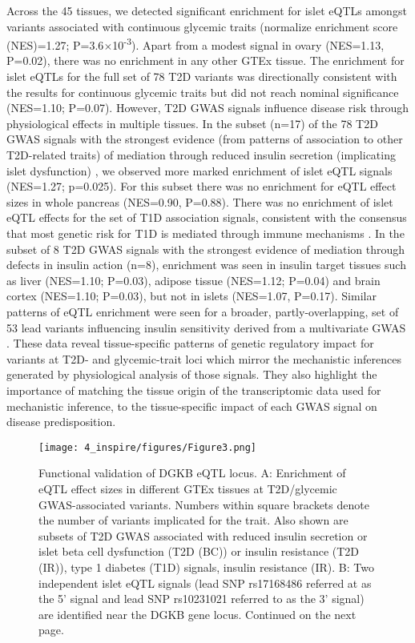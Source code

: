 Across the 45 tissues, we detected significant enrichment for islet eQTLs amongst variants associated with continuous glycemic traits (normalize enrichment score (NES)=1.27; P=3.6$\times$10\textsuperscript{-3}). Apart from a modest signal in ovary (NES=1.13, P=0.02), there was no enrichment in any other GTEx tissue. The enrichment for islet eQTLs for the full set of 78 T2D variants was directionally consistent with the results for continuous glycemic traits but did not reach nominal significance (NES=1.10; P=0.07). However, T2D GWAS signals influence disease risk through physiological effects in multiple tissues. In the subset (n=17) of the 78 T2D GWAS signals with the strongest evidence (from patterns of association to other T2D-related traits) of mediation through reduced insulin secretion (implicating islet dysfunction) \cite{mahajanRefiningAccuracyValidated2018, dimasImpactTypeDiabetes2014, woodGenomeWideAssociationStudy2017}, we observed more marked enrichment of islet eQTL signals (NES=1.27; p=0.025). For this subset there was no enrichment for eQTL effect sizes in whole pancreas (NES=0.90, P=0.88). There was no enrichment of islet eQTL effects for the set of T1D association signals, consistent with the consensus that most genetic risk for T1D is mediated through immune mechanisms \cite{onengut-gumuscuFineMappingType2015}.
In the subset of 8 T2D GWAS signals with the strongest evidence of mediation through defects in insulin action (n=8), enrichment was seen in insulin target tissues such as liver (NES=1.10; P=0.03), adipose tissue (NES=1.12; P=0.04) and brain cortex (NES=1.10; P=0.03), but not in islets (NES=1.07, P=0.17). Similar patterns of eQTL enrichment were seen for a broader, partly-overlapping, set of 53 lead variants influencing insulin sensitivity derived from a multivariate GWAS \cite{lottaIntegrativeGenomicAnalysis2017}. 
These data reveal tissue-specific patterns of genetic regulatory impact for variants at T2D- and glycemic-trait loci which mirror the mechanistic inferences generated by physiological analysis of those signals. They also highlight the importance of matching the tissue origin of the transcriptomic data used for mechanistic inference, to the tissue-specific impact of each GWAS signal on disease predisposition.

\begin{figure}
    \centering
    \texttt{[image: 4\_inspire/figures/Figure3.png]}
    \caption[Functional validation of DGKB eQTL locus]{Functional validation of DGKB eQTL locus. A: Enrichment of eQTL effect sizes in different GTEx tissues at T2D/glycemic GWAS-associated variants. Numbers within square brackets denote the number of variants implicated for the trait. Also shown are subsets of T2D GWAS associated with reduced insulin secretion or islet beta cell dysfunction (T2D (BC)) or insulin resistance (T2D (IR)), type 1 diabetes (T1D) signals, insulin resistance (IR). B: Two independent islet eQTL signals (lead SNP rs17168486 referred at as the 5' signal and lead SNP rs10231021 referred to as the 3' signal) are identified near the DGKB gene locus. Continued on the next page.}
    \label{fig:c4_f3}
  \end{figure}

